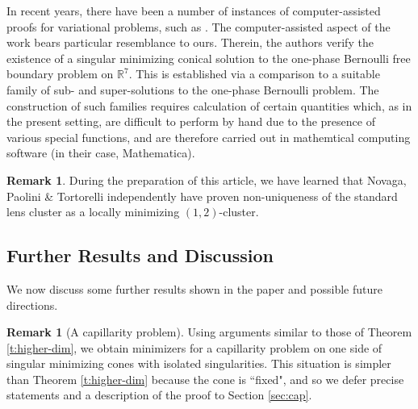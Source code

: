 \documentclass[10pt,reqno]{amsart}
\numberwithin{equation}{section}
\theoremstyle{definition}
\newtheorem{remark}[theorem]{Remark}
\newcommand{\R}{\mathbb{R}}
\begin{document}
In recent years, there have been a number of instances of computer-assisted proofs for variational problems, such as \cites{DeSilvaJerison09,Mil24,DLGMV24}. The computer-assisted aspect of the work \cite{DeSilvaJerison09} bears particular resemblance to ours. Therein, the authors verify the existence of a singular minimizing conical solution to the one-phase Bernoulli free boundary problem on $\R^7$. This is established via a comparison to a suitable family of sub- and super-solutions to the one-phase Bernoulli problem. The construction of such families requires 
calculation of certain quantities which, as in the present setting, are difficult to perform by hand due to the presence of various special functions, and are therefore carried out in mathemtical computing software (in their case, Mathematica).



{
\begin{remark}
    During the preparation of this article, we have learned that Novaga, Paolini \& Tortorelli \cite{NovPaoTor25} independently have proven non-uniqueness of the standard lens cluster as a locally minimizing $(1,2)$-cluster.
\end{remark}}
\medskip
 
\subsection{Further Results and Discussion} We now discuss some further results shown in the paper and possible future directions.


\begin{remark}[A capillarity problem]
Using arguments similar to those of Theorem \ref{t:higher-dim}, we obtain minimizers for a capillarity problem on one side of singular minimizing cones with isolated singularities. This situation is simpler than Theorem \ref{t:higher-dim} because the cone is ``fixed", and so we defer precise statements and a description of the proof to Section \ref{sec:cap}.
\end{remark}
\end{document}
